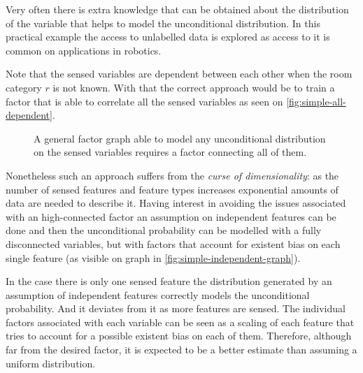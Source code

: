 Very often there is extra knowledge that can be obtained about the distribution
of the variable that helps to model the unconditional distribution.
In this practical example the access to unlabelled data is explored as access to
it is common on applications in robotics.

Note that the sensed variables are dependent between each other when the room
category $r$ is not known. With that the correct approach would be to train a
factor that is able to correlate all the sensed variables as seen on
\autoref{fig:simple-all-dependent}.

\begin{figure}[h]
\centering
{}
\caption{\label{fig:simple-all-dependent}A general factor graph able
         to model any unconditional distribution on the sensed variables
         requires a factor connecting all of them.}
\end{figure}

Nonetheless such an approach suffers from
the \emph{curse of dimensionality}: as the number of sensed features and feature
types increases exponential amounts of data are needed to describe it.
Having interest in avoiding the issues associated with an high-connected factor
an assumption on independent features can be done and then the unconditional
probability can be modelled with a fully disconnected variables, but with
factors that account for existent bias on each single feature (as visible on
graph in \autoref{fig:simple-independent-graph}).

In the case there is only one sensed feature the distribution generated by an
assumption of independent features correctly models the unconditional
probability. And it deviates from it as more features are sensed.
The individual factors associated with each variable can be seen as a scaling of
each feature that tries to account for a possible existent bias on each
of them. Therefore, although far from the desired factor, it is expected to be a
better estimate than assuming a uniform distribution.

